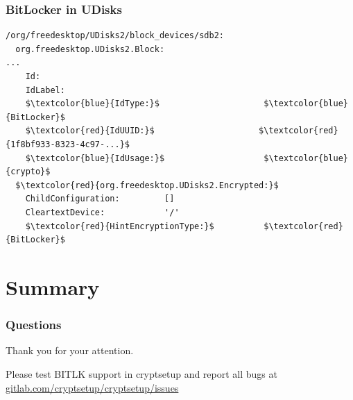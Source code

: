 \documentclass{beamer}
\begin{document}
\begin{frame}[fragile]
	\frametitle{BitLocker in UDisks}

	\begin{lstlisting}[frame=none, escapechar=$, basicstyle=\ttfamily\small, columns=fullflexible, keepspaces=true]
/org/freedesktop/UDisks2/block_devices/sdb2:
  org.freedesktop.UDisks2.Block:
...
    Id:
    IdLabel:
    $\textcolor{blue}{IdType:}$                     $\textcolor{blue}{BitLocker}$
    $\textcolor{red}{IdUUID:}$                     $\textcolor{red}{1f8bf933-8323-4c97-...}$
    $\textcolor{blue}{IdUsage:}$                    $\textcolor{blue}{crypto}$
  $\textcolor{red}{org.freedesktop.UDisks2.Encrypted:}$
    ChildConfiguration:         []
    CleartextDevice:            '/'
    $\textcolor{red}{HintEncryptionType:}$          $\textcolor{red}{BitLocker}$
\end{lstlisting}

\end{frame}


\section{Summary}

\begin{frame}
	\frametitle{Questions}

	\begin{center}
	Thank you for your attention.
	\end{center}

\vspace{0.5cm}

	\begin{center}
	Please test BITLK support in cryptsetup and report all bugs at \href{https://gitlab.com/cryptsetup/cryptsetup/issues}{gitlab.com/cryptsetup/cryptsetup/issues}
	\end{center}
\end{frame}
\end{document}

